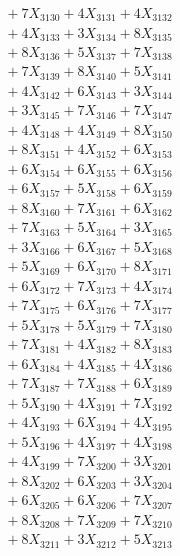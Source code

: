 \documentclass[a4paper,10pt]{article}
\begin{document}
{\begin{align}
&\;  + 7 X_{3130} + 4 X_{3131} + 4 X_{3132} \\[0.3ex]
&\;  + 4 X_{3133} + 3 X_{3134} + 8 X_{3135} \\[0.3ex]
&\;  + 8 X_{3136} + 5 X_{3137} + 7 X_{3138} \\[0.3ex]
&\;  + 7 X_{3139} + 8 X_{3140} + 5 X_{3141} \\[0.3ex]
&\;  + 4 X_{3142} + 6 X_{3143} + 3 X_{3144} \\[0.3ex]
&\;  + 3 X_{3145} + 7 X_{3146} + 7 X_{3147} \\[0.3ex]
&\;  + 4 X_{3148} + 4 X_{3149} + 8 X_{3150} \\[0.3ex]
&\;  + 8 X_{3151} + 4 X_{3152} + 6 X_{3153} \\[0.3ex]
&\;  + 6 X_{3154} + 6 X_{3155} + 6 X_{3156} \\[0.3ex]
&\;  + 6 X_{3157} + 5 X_{3158} + 6 X_{3159} \\[0.5ex]\allowbreak
&\;  + 8 X_{3160} + 7 X_{3161} + 6 X_{3162} \\[0.3ex]
&\;  + 7 X_{3163} + 5 X_{3164} + 3 X_{3165} \\[0.3ex]
&\;  + 3 X_{3166} + 6 X_{3167} + 5 X_{3168} \\[0.3ex]
&\;  + 5 X_{3169} + 6 X_{3170} + 8 X_{3171} \\[0.3ex]
&\;  + 6 X_{3172} + 7 X_{3173} + 4 X_{3174} \\[0.3ex]
&\;  + 7 X_{3175} + 6 X_{3176} + 7 X_{3177} \\[0.3ex]
&\;  + 5 X_{3178} + 5 X_{3179} + 7 X_{3180} \\[0.3ex]
&\;  + 7 X_{3181} + 4 X_{3182} + 8 X_{3183} \\[0.3ex]
&\;  + 6 X_{3184} + 4 X_{3185} + 4 X_{3186} \\[0.3ex]
&\;  + 7 X_{3187} + 7 X_{3188} + 6 X_{3189} \\[0.5ex]\allowbreak
&\;  + 5 X_{3190} + 4 X_{3191} + 7 X_{3192} \\[0.3ex]
&\;  + 4 X_{3193} + 6 X_{3194} + 4 X_{3195} \\[0.3ex]
&\;  + 5 X_{3196} + 4 X_{3197} + 4 X_{3198} \\[0.3ex]
&\;  + 4 X_{3199} + 7 X_{3200} + 3 X_{3201} \\[0.3ex]
&\;  + 8 X_{3202} + 6 X_{3203} + 3 X_{3204} \\[0.3ex]
&\;  + 6 X_{3205} + 6 X_{3206} + 7 X_{3207} \\[0.3ex]
&\;  + 8 X_{3208} + 7 X_{3209} + 7 X_{3210} \\[0.3ex]
&\;  + 8 X_{3211} + 3 X_{3212} + 5 X_{3213} \\[0.3ex]

\end{align}}
\end{document}
